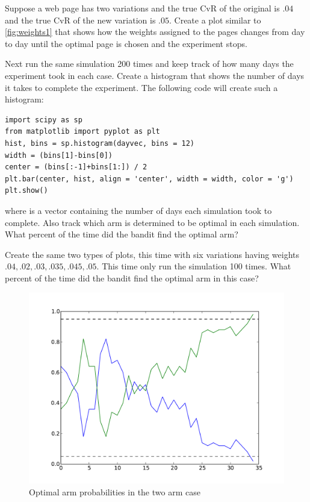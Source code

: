 \begin{problem}
Suppose a web page has two variations and the true CvR of the original is $.04$ and the true CvR of the new variation is $.05$.  Create a plot similar to \ref{fig:weights1} that shows how the weights assigned to the pages changes from day to day until the optimal page is chosen and the experiment stops.

Next run the same simulation 200 times and keep track of how many days the experiment took in each case.  Create a histogram that shows the number of days it takes to complete the experiment.  The following code will create such a histogram:

\begin{lstlisting}
import scipy as sp
from matplotlib import pyplot as plt
hist, bins = sp.histogram(dayvec, bins = 12)
width = (bins[1]-bins[0])
center = (bins[:-1]+bins[1:]) / 2
plt.bar(center, hist, align = 'center', width = width, color = 'g')
plt.show()
\end{lstlisting}
where  is a vector containing the number of days each simulation took to complete.  Also track which arm is determined to be optimal in each simulation.  What percent of the time did the bandit find the optimal arm?

Create the same two types of plots, this time with six variations having weights $.04,.02,.03,.035,.045,.05$.  This time only run the simulation 100 times.  What percent of the time did the bandit find the optimal arm in this case?
\end{problem}

\begin{figure}
\begin{center}
        \includegraphics[width=\textwidth]{./Applications/MarkDecProc/weights1.pdf}
        \caption{Optimal arm probabilities in the two arm case}
\end{center}
\end{figure}\label{fig:weights1}

